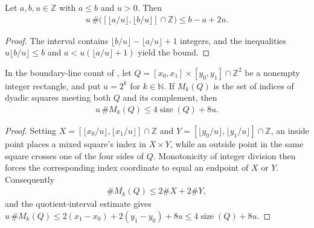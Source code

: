 \begin{lemma}
    \label{thm:area_law_quotient_interval_count}
    \leanok
    Let $a,b,u\in\mathbb Z$ with $a\le b$ and $u>0$. Then
    \begin{align}
        u\,\#\bigl([\lfloor a/u\rfloor,\lfloor b/u\rfloor]\cap\mathbb Z\bigr)
        \le b-a+2u.
    \end{align}
\end{lemma}
\begin{proof}\leanok
    The interval contains $\lfloor b/u\rfloor-\lfloor a/u\rfloor+1$ integers,
    and the inequalities $u\lfloor b/u\rfloor\le b$ and
    $a<u(\lfloor a/u\rfloor+1)$ yield the bound.
\end{proof}

\begin{lemma}
    \label{thm:area_law_rectangle_mixed_count}
    \leanok
    In the boundary-line count of
    \cite[proof of Proposition~9.5, lines~717--729]{OpenAI2026AreaLaw}, let
    $Q=[x_0,x_1]\times[y_0,y_1]\cap\mathbb Z^2$ be a nonempty integer
    rectangle, and put $u=2^k$ for $k\in\mathbb N$.
    If $M_k(Q)$ is the set of indices of dyadic squares meeting both $Q$
    and its complement, then
    \begin{align}
        u\,\#M_k(Q)\le4\operatorname{size}(Q)+8u.
    \end{align}
\end{lemma}
\begin{proof}\leanok
    Setting $X=[\lfloor x_0/u\rfloor,\lfloor x_1/u\rfloor]\cap\mathbb Z$ and
    $Y=[\lfloor y_0/u\rfloor,\lfloor y_1/u\rfloor]\cap\mathbb Z$,
    an inside point places a mixed square's index in $X\times Y$, while
    an outside point in the same square crosses one of the four sides of $Q$.
    Monotonicity of integer division then forces the corresponding index
    coordinate to equal an endpoint of $X$ or $Y$. Consequently
    \begin{align}
        \#M_k(Q)\le2\#X+2\#Y,
    \end{align}
    and the quotient-interval estimate gives
    $u\,\#M_k(Q)\le2(x_1-x_0)+2(y_1-y_0)+8u\le4\operatorname{size}(Q)+8u$.
\end{proof}

